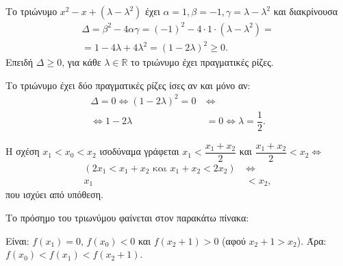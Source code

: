 
\begin{alist}
\item Το τριώνυμο $x^2 - x + (\lambda - \lambda^2)$ έχει $\alpha = 1, \beta = -1, \gamma = \lambda - \lambda^2$ και διακρίνουσα
\begin{gather*}
\Delta = \beta^2 - 4\alpha\gamma = (-1)^2 - 4 \cdot 1 \cdot (\lambda - \lambda^2) = \\
= 1 - 4\lambda + 4\lambda^2 = (1 - 2\lambda)^2 \ge 0.
\end{gather*}
Επειδή $\Delta \ge 0$, για κάθε $\lambda \in \mathbb{R}$ το τριώνυμο έχει πραγματικές ρίζες.

\item Το τριώνυμο έχει δύο πραγματικές ρίζες ίσες αν και μόνο αν:
\begin{align*}
\Delta = 0 \Leftrightarrow (1 - 2\lambda)^2 = 0 \ &\Leftrightarrow \\
\Leftrightarrow 1 - 2\lambda &= 0 \Leftrightarrow \lambda = \dfrac{1}{2}.
\end{align*}

\item 
\begin{rlist}
\item Η σχέση $x_1 < x_0 < x_2$ ισοδύναμα γράφεται
$x_1 < \dfrac{x_1 + x_2}{2}$ και $\dfrac{x_1 + x_2}{2} < x_2 \Leftrightarrow$
\begin{align*}
(2x_1 < x_1 + x_2 \text{ και } x_1 + x_2 < 2x_2) \ &\Leftrightarrow \\
x_1 &< x_2,
\end{align*}
που ισχύει από υπόθεση.

\item Το πρόσημο του τριωνύμου φαίνεται στον παρακάτω πίνακα:

\begin{center}
\end{center}

Είναι:
$f(x_1) = 0$, $f(x_0) < 0$ και $f(x_2 + 1) > 0$ (αφού $x_2 + 1 > x_2$).
Άρα:
$f(x_0) < f(x_1) < f(x_2 + 1)$.
\end{rlist}
\end{alist}

